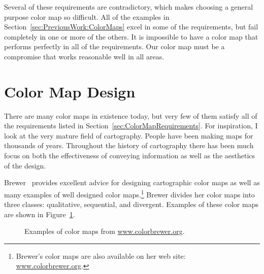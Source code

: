 \documentclass[twocolumn]{article}
\newcommand{\scite}[1]{~\cite{#1}}
\newcommand{\sticky}[1]{\textsc{[#1]}}
\begin{document}

Several of these requirements are contradictory, which makes choosing a
general purpose color map so difficult.  All of the examples in
Section~\ref{sec:PreviousWork:ColorMaps} excel in some of the requirements,
but fail completely in one or more of the others.  It is impossible to have
a color map that performs perfectly in all of the requirements.  Our color
map must be a compromise that works reasonable well in all areas.


\section{Color Map Design}
\label{sec:ColorMapDesign}

There are many color maps in existence today, but very few of them satisfy
all of the requirements listed in Section~\ref{sec:ColorMapRequirements}.
For inspiration, I look at the very mature field of cartography.  People
have been making maps for thousands of years.  Throughout the history of
cartography there has been much focus on both the effectiveness of
conveying information as well as the aesthetics of the design.

Brewer\scite{Brewer05} provides excellent advice for designing cartographic
color maps as well as many examples of well designed color
maps.\footnote{Brewer's color maps are also available on her web site:
  \href{http://www.colorbrewer.org}{www.colorbrewer.org}.} Brewer divides
her color maps into three classes: qualitative, sequential, and divergent.
Examples of these color maps are shown in Figure~\ref{fig:BrewerExamples}.

\begin{figure}
  \centering
  \subfigure[Qualitative]{\sticky{Qualitative}}
  \subfigure[Sequential]{\sticky{Sequential}}
  \subfigure[Divergent]{\sticky{Divergent}}
  \caption{Examples of color maps from
    \href{http://www.colorbrewer.org}{www.colorbrewer.org}.}
  \label{fig:BrewerExamples}
\end{figure}
\end{document}
